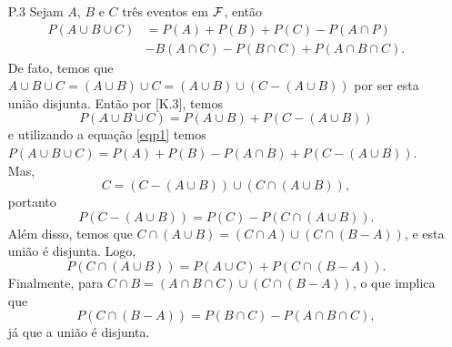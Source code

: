 \begin{frame}
\begin{enumerate}
\item[P.3]  Sejam $A$, $B$ e $C$ três eventos em ${\cal F}$, então 
$$
\begin{aligned}
P(A\cup B\cup C) & = P(A)+P(B)+P(C)-P(A\cap P) \\ &-B(A\cap C)-P(B\cap C)+P(A\cap B\cap C).
\end{aligned}
$$ 
De fato, temos que $A\cup B\cup C=(A\cup B)\cup C=(A\cup B)\cup (C - (A\cup B))$ por ser esta união disjunta. Então por [K.3], temos 
\begin{equation}
\label{eqp1}
P(A\cup B\cup C)=P(A\cup B)+P(C - (A\cup B)) 
\end{equation} 
e utilizando a equação \eqref{eqp1} temos 
$P(A\cup B\cup C)=P(A)+P(B)-P(A\cap B)+P(C - (A\cup B)).$ Mas, $$ C=(C - (A\cup B))\cup(C\cap(A\cup B)),$$ portanto \begin{equation}
\label{eqp2}
P(C - (A\cup B))=P(C)-P(C\cap(A\cup B)).
\end{equation}	
Além disso, temos que $ C\cap (A\cup B)=(C\cap A)\cup (C\cap(B -  A)) $, e esta união é disjunta. Logo,  
\begin{equation}
\label{eqp3}
P(C\cap (A\cup B))=P(A\cup C)+P(C\cap(B - A)).
\end{equation} 	
Finalmente, para $ C\cap B = (A\cap B\cap C)\cup (C\cap(B - A)) $, o que implica que 
\begin{equation}
\label{eqp4}
P(C\cap(B - A))=P(B\cap C) - P(A\cap B\cap C),
\end{equation} 		
já que a união é disjunta. 
\end{enumerate}
\end{frame}

